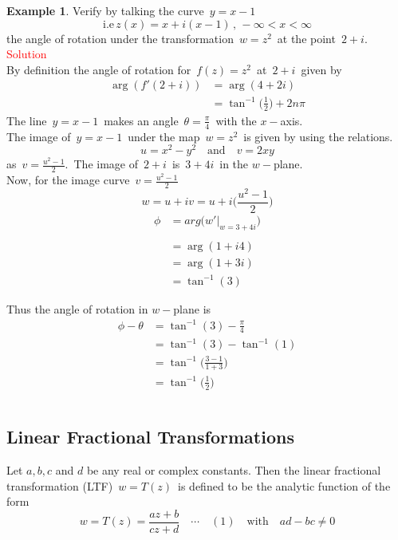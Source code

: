 \documentclass[11pt,a4paper]{article}
\theoremstyle{definition}
\newtheorem{example}[thm]{Example}
\begin{document}
\begin{example}
Verify by talking the curve $\, y = x - 1$ $$\text{i.e}\, z(x) = x + i(x -1)\,, \, -\infty < x < \infty$$ the angle of rotation under the transformation $\, w = z^2\,$ at the point $\, 2 +i$.\\


\textcolor{red}{Solution}\\
By definition the angle of rotation for $\, f(z) = z^2\,$ at $\, 2 + i\,$ given by 
\begin{align*}
\operatorname{arg}( f'(2+i)) &  = \operatorname{arg} (4 + 2i)\\
& = \tan^{-1}\Big(\frac{1}{2}\Big) + 2n\pi
\end{align*}
The line $\, y = x - 1\,$ makes an angle $\, \theta = \frac{\pi}{4}\,$ with the $x-$axis.\\

The image of $\, y = x - 1\,$ under the map $\, w = z^2\,$ is given by using the relations. 
$$ u = x^2 - y^2 \quad  \text{and}\quad  v = 2xy$$ as $\, v = \frac{u^2 - 1}{2}.\,$ The image of $\, 2 + i\,$ is $\, 3 + 4i\,$ in the $w-$plane.\\

Now, for the image curve $\, v = \frac{u^2 - 1}{2}$ $$ w = u +iv = u + i\Big(\frac{u^2 - 1}{2}\Big)$$
\begin{align*}
\phi & = arg \Bigg(w'\Bigg|_{w = 3 + 4i}\Bigg)\\\\
& = \operatorname{arg}( 1 +i4)\\
& = \operatorname{arg}( 1 + 3i)\\
& = \tan^{-1}(3)
\end{align*}

Thus the angle of rotation in $w-$plane is 
\begin{align*}
\phi - \theta & = \tan^{-1}(3) - \frac{\pi}{4}\\
& = \tan^{-1}(3) - \tan^{-1}(1)\\
& = \tan^{-1}\Big(\frac{3 - 1}{1 + 3}\Big)\\
& = \tan^{-1}\Big(\frac{1}{2}\Big)\\\\
\end{align*}
\end{example}

{\color[wave]{485}\subsection{Linear Fractional Transformations}}
Let $a, b,c$ and $d$ be any real or complex constants. Then the linear fractional transformation (LTF) $\, w = T(z)\,$ is defined to be the analytic function of the form 
$$\boxed {w = T(z) = \frac{az + b}{cz + d}\quad  \cdots\quad  (1)\quad \text{with}\quad  ad - bc \neq 0}$$
\end{document}
